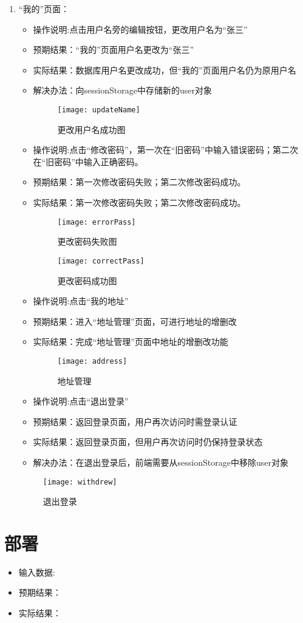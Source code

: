 \begin{enumerate}
\item {“我的”页面}：
\begin{itemize}
\item{操作说明}:点击用户名旁的编辑按钮，更改用户名为“张三”
\item {预期结果}：“我的”页面用户名更改为“张三”
\item {实际结果}：数据库用户名更改成功，但“我的”页面用户名仍为原用户名
\item {解决办法}：向sessionStorage中存储新的user对象
\begin{figure}[htbp]
\centering
\texttt{[image: updateName]}
\caption{更改用户名成功图}\label{fig:updateName}
\end{figure}
\item{操作说明}:点击“修改密码”，第一次在“旧密码”中输入错误密码；第二次在“旧密码”中输入正确密码。
\item {预期结果}：第一次修改密码失败；第二次修改密码成功。
\item {实际结果}：第一次修改密码失败；第二次修改密码成功。
\begin{figure}[htbp]
\centering
\texttt{[image: errorPass]}
\caption{更改密码失败图}\label{fig:errorPass}
\end{figure}
\begin{figure}[htbp]
\centering
\texttt{[image: correctPass]}
\caption{更改密码成功图}\label{fig:correctPass}
\end{figure}
\item{操作说明}:点击“我的地址”
\item {预期结果}：进入“地址管理”页面，可进行地址的增删改
\item {实际结果}：完成“地址管理”页面中地址的增删改功能
\begin{figure}[htbp]
\centering
\texttt{[image: address]}
\caption{地址管理}\label{fig:address}
\end{figure}
\item{操作说明}:点击“退出登录”
\item {预期结果}：返回登录页面，用户再次访问时需登录认证
\item {实际结果}：返回登录页面，但用户再次访问时仍保持登录状态
\item {解决办法}：在退出登录后，前端需要从sessionStorage中移除user对象
\end{itemize}
\begin{figure}[htbp]
\centering
\texttt{[image: withdrew]}
\caption{退出登录}\label{fig:withdrew}
\end{figure}
\end{enumerate}

\section{部署}
\begin{itemize}
\item{输入数据}:
\item {预期结果}：
\item {实际结果}：
\end{itemize}

